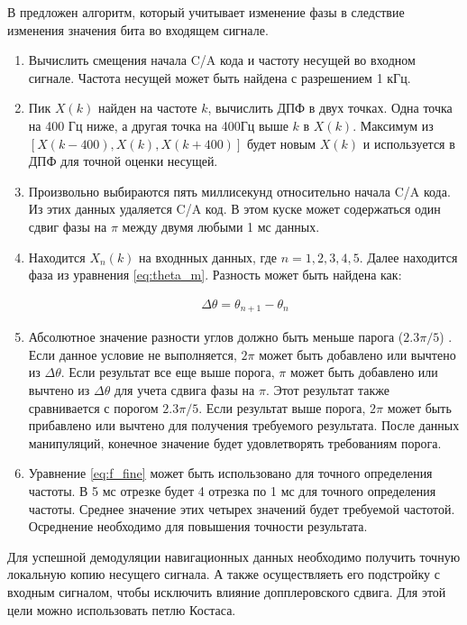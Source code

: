 В \cite{tsui} предложен алгоритм, который учитывает изменение фазы в следствие изменения значения бита во входящем сигнале.
\begin{enumerate}
\renewcommand{\labelenumi}{\arabic{enumi}.}
    \item Вычислить смещения начала C/A кода и частоту несущей во входном сигнале. Частота несущей может быть найдена с разрешением 1 кГц.
    \item Пик ${X(k)}$ найден на частоте ${k}$, вычислить ДПФ в двух точках. Одна точка на 400 Гц ниже, а другая точка на 400Гц выше ${k}$ в ${X(k)}$.
    	  Максимум из ${[X(k-400), X(k), X(k+400)]}$ будет новым ${X(k)}$ и используется в ДПФ для точной оценки несущей.
    \item Произвольно выбираются пять миллисекунд относительно начала C/A кода. Из этих данных удаляется C/A код. В этом куске может
          содержаться один сдвиг фазы на ${\pi}$ между двумя любыми 1 мс данных.
    \item Находится ${X_n(k)}$ на входнных данных, где ${n = 1, 2, 3, 4, 5}$. Далее находится фаза из уравнения \ref{eq:theta_m}. Разность может
          быть найдена как:

	\begin{eqnarray}
	\Delta{\theta} = \theta_{n+1} - \theta_n
	\label{eq:Delta_phi}
	\end{eqnarray}

    \item Абсолютное значение разности углов должно быть меньше парога (${2.3\pi/5}$) \cite{tsui}. Если данное условие не выполняется, ${2\pi}$
          может быть добавлено или вычтено из ${\Delta{\theta}}$. Если результат все еще выше порога, ${\pi}$ может быть добавлено или вычтено
	  из ${\Delta{\theta}}$ для учета сдвига фазы на ${\pi}$. Этот результат также сравнивается с порогом ${2.3\pi/5}$. Если результат выше
	  порога, ${2\pi}$ может быть прибавлено или вычтено для получения требуемого результата. После данных манипуляций, конечное значение будет
	  удовлетворять требованиям порога.
    \item Уравнение \ref{eq:f_fine} может быть использовано для точного определения частоты. В 5 мс отрезке будет 4 отрезка по 1 мс для точного
          определения частоты. Среднее значение этих четырех значений будет требуемой частотой. Осреднение необходимо для повышения точности результата.
\end{enumerate}


Для успешной демодуляции навигационных данных необходимо получить точную локальную копию несущего сигнала. А
также осуществляеть его подстройку с входным сигналом, чтобы исключить влияние допплеровского сдвига. Для этой 
цели можно использовать петлю Костаса.

